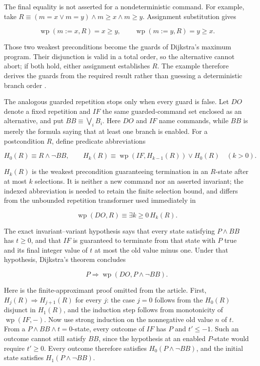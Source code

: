 The final equality is not asserted for a nondeterministic command.  For
example, take
\(R\equiv(m=x\lor m=y)\land m\geq x\land m\geq y\).  Assignment substitution
gives

\[
 \operatorname{wp}(m:=x,R)=x\geq y,
 \qquad
 \operatorname{wp}(m:=y,R)=y\geq x.
\]

Those two weakest preconditions become the guards of Dijkstra's maximum
program.  Their disjunction is valid in a total order, so the alternative
cannot abort; if both hold, either assignment establishes \(R\).  The example
therefore derives the guards from the required result rather than guessing a
deterministic branch order \cite[\S4]{Dijkstra1975}.

The analogous guarded repetition stops only when every guard is false.
Let \(DO\) denote a fixed repetition and \(IF\) the same guarded-command set
enclosed as an alternative, and put \(BB\equiv\bigvee_i B_i\).  Here \(DO\)
and \(IF\) name commands, while \(BB\) is merely the formula saying that at
least one branch is enabled.  For a postcondition \(R\), define predicate
abbreviations

\[
 H_0(R)\equiv R\land\neg BB,
 \qquad
 H_k(R)\equiv
   \operatorname{wp}(IF,H_{k-1}(R))\lor H_0(R)\quad(k>0).
\]

\(H_k(R)\) is the weakest precondition guaranteeing termination in an
\(R\)-state after at most \(k\) selections.  It is neither a new command nor an
asserted invariant; the indexed abbreviation is needed to retain the finite
selection bound, and differs from the unbounded repetition transformer used
immediately in

\[
 \operatorname{wp}(DO,R)\equiv\exists k\geq0\,H_k(R).
\]

The exact invariant--variant hypothesis says that every state satisfying
\(P\land BB\) has \(t\geq0\), and that \(IF\) is guaranteed to terminate from
that state with \(P\) true and its final integer value of \(t\) at most the old
value minus one.  Under that hypothesis, Dijkstra's theorem concludes

\[
 P\Rightarrow\operatorname{wp}(DO,P\land\neg BB).
\]

Here is the finite-approximant proof omitted from the article.  First,
\(H_j(R)\Rightarrow H_{j+1}(R)\) for every \(j\): the case \(j=0\) follows
from the \(H_0(R)\) disjunct in \(H_1(R)\), and the induction step follows
from monotonicity of \(\operatorname{wp}(IF,-)\).  Now use strong induction on
the nonnegative old value \(n\) of \(t\).  From a
\(P\land BB\land t=0\)-state, every outcome of \(IF\) has \(P\) and
\(t'\leq-1\).  Such an outcome cannot still satisfy \(BB\), since the
hypothesis at an enabled \(P\)-state would require \(t'\geq0\).  Every outcome
therefore satisfies \(H_0(P\land\neg BB)\), and the initial state satisfies
\(H_1(P\land\neg BB)\).

